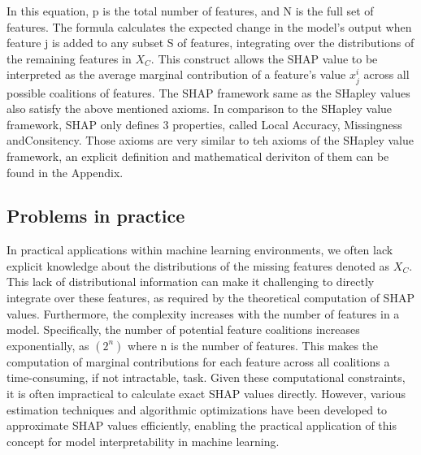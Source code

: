 \documentclass[12pt]{article}
\begin{document}
In this equation, p is the total number of features, and N is the full set of features. The formula calculates the expected change in the model's output when feature j is added to any subset S of features, integrating over the distributions of the remaining features in $X_C$. 
This construct allows the SHAP value to be interpreted as the average marginal contribution of a feature's value $x^{i}_j $ across all possible coalitions of features.
The SHAP framework same as the SHapley values also satisfy the above mentioned axioms. In comparison to the SHapley value framework, SHAP only defines 3 properties, called Local Accuracy, Missingness andConsitency. Those axioms are very similar to teh axioms of the SHapley value framework, an explicit definition and mathematical deriviton of them can be found in the Appendix.

\subsection{Problems in practice}
 In practical applications within machine learning environments, we often lack explicit knowledge about the distributions of the missing features denoted as $X_C$. This lack of distributional information can make it challenging to directly integrate over these features, as required by the theoretical computation of SHAP values.
 Furthermore, the complexity increases with the number of features in a model. Specifically, the number of potential feature coalitions increases exponentially, as $(2^n)$ where n is the number of features. 
 This makes the computation of marginal contributions for each feature across all coalitions a time-consuming, if not intractable, task.
Given these computational constraints, it is often impractical to calculate exact SHAP values directly. However, various estimation techniques and algorithmic optimizations have been developed to approximate SHAP values efficiently, enabling the practical application of this concept for model interpretability in machine learning.
\end{document}
